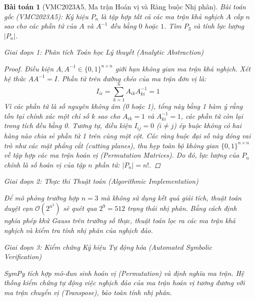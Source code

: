 \documentclass{article}
\newtheorem{baitoan}{Bài toán}
\begin{document}
\begin{baitoan}[VMC2023A5, Ma trận Hoán vị và Ràng buộc Nhị phân]
 \emph{Bài toán gốc (VMC2023A5):} 
 Ký hiệu $P_n$ là tập hợp tất cả các ma trận khả nghịch $A$ cấp $n$ sao cho các phần tử của $A$ và $A^{-1}$ đều bằng $0$ hoặc $1$. Tìm $P_3$ và tính lực lượng $|P_n|$.

\vspace{0.5em}\noindent\emph{Giai đoạn 1: Phân tích Toán học Lý thuyết (Analytic Abstraction)}
 
\begin{proof}
 Điều kiện $A, A^{-1} \in \{0, 1\}^{n \times n}$ giới hạn không gian ma trận khả nghịch. Xét hệ thức $A A^{-1} = I$. Phần tử trên đường chéo của ma trận đơn vị là:
 \begin{equation}
 I_{ii} = \sum_{k=1}^n A_{ik} A^{-1}_{ki} = 1
 \end{equation}
 Vì các phần tử là số nguyên không âm (0 hoặc 1), tổng này bằng 1 hàm ý rằng tồn tại chính xác một chỉ số $k$ sao cho $A_{ik} = 1$ và $A^{-1}_{ki} = 1$, các phần tử còn lại trong tích đều bằng 0. Tương tự, điều kiện $I_{ij} = 0$ ($i \neq j$) ép buộc không có hai hàng nào chia sẻ phần tử 1 trên cùng một cột. 
 Các ràng buộc đại số này đóng vai trò như các mặt phẳng cắt (cutting planes), thu hẹp toàn bộ không gian $\{0, 1\}^{n \times n}$ về tập hợp các ma trận hoán vị (Permutation Matrices). Do đó, lực lượng của $P_n$ chính là số hoán vị của tập $n$ phần tử: $|P_n| = n!$.
 \end{proof}

\vspace{0.5em}\noindent\emph{Giai đoạn 2: Thực thi Thuật toán (Algorithmic Implementation)}
 
 Để mô phỏng trường hợp $n=3$ mà không sử dụng kết quả giải tích, thuật toán duyệt cạn $\mathcal{O}(2^{n^2})$ sẽ quét qua $2^9 = 512$ trạng thái nhị phân. Bằng cách định nghĩa phép khử Gauss trên trường số thực, thuật toán lọc ra các ma trận khả nghịch và kiểm tra tính nhị phân của nghịch đảo.



\vspace{0.5em}\noindent\emph{Giai đoạn 3: Kiểm chứng Ký hiệu Tự động hóa (Automated Symbolic Verification)}
 
 \textsf{SymPy} tích hợp mô-đun sinh hoán vị (Permutation) và định nghĩa ma trận. Hệ thống kiểm chứng tự động việc nghịch đảo của ma trận hoán vị tương đương với ma trận chuyển vị (Transpose), bảo toàn tính nhị phân.


\end{baitoan}
\end{document}
